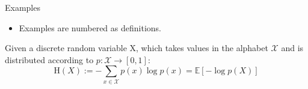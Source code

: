 \begin{frame}{}{Examples}
    \begin{itemize}
        \item Examples are numbered as definitions.
    \end{itemize}
    \begin{examp}
         Given a discrete random variable X, which takes values in the alphabet $\mathcal{X}$ and is distributed according to  $p:{\mathcal {X}}\to [0,1]$:
            \begin{equation}
                \mathrm {H} (X):=-\sum _{x\in {\mathcal {X}}}p(x)\log p(x)=\mathbb {E} [-\log p(X)]
            \end{equation}
    \end{examp}
\end{frame}

